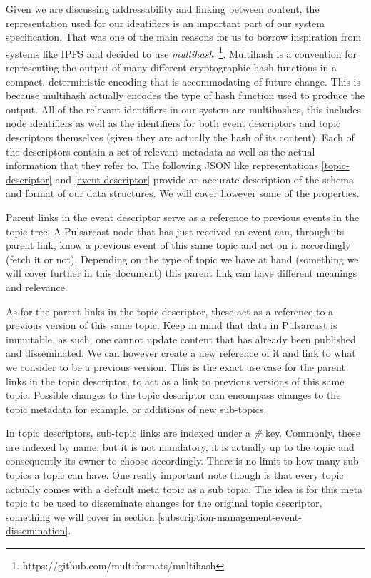 Given we are discussing addressability and linking between content, the
representation used for our identifiers is an important part of our system
specification. That was one of the main reasons for us to borrow inspiration
from systems like IPFS and decided to use
\emph{multihash}~\footnote{https://github.com/multiformats/multihash}.
Multihash is a convention for representing the output of many different
cryptographic hash functions in a compact, deterministic encoding that is
accommodating of future change. This is because multihash actually encodes the
type of hash function used to produce the output. All of the relevant
identifiers in our system are multihashes, this includes node identifiers as
well as the identifiers for both event descriptors and topic descriptors
themselves (given they are actually the hash of its content). Each of the
descriptors contain a set of relevant metadata as well as the actual
information that they refer to. The following JSON like representations
\ref{topic-descriptor} and \ref{event-descriptor} provide an accurate
description of the schema and format of our data structures. We will cover
however some of the properties.

Parent links in the event descriptor serve as a reference to previous events in
the topic tree. A Pulsarcast node that has just received an event can, through
its parent link, know a previous event of this same topic and act on it
accordingly (fetch it or not). Depending on the type of topic we have at hand
(something we will cover further in this document) this parent link can have
different meanings and relevance.

As for the parent links in the topic descriptor, these act as a reference to a
previous version of this same topic. Keep in mind that data in Pulsarcast is
immutable, as such, one cannot update content that has already been published
and disseminated. We can however create a new reference of it and link to what
we consider to be a previous version. This is the exact use case for the parent
links in the topic descriptor, to act as a link to previous versions of this
same topic. Possible changes to the topic descriptor can encompass changes to
the topic metadata for example, or additions of new sub-topics.

In topic descriptors, sub-topic links are indexed under a \emph{\#} key.
Commonly, these are indexed by name, but it is not mandatory, it is actually up
to the topic and consequently its owner to choose accordingly.  There is no
limit to how many sub-topics a topic can have. One really important note though is that every topic actually comes with a default meta topic as a sub topic. The idea is for this meta topic to be used to disseminate changes for the original topic descriptor, something we will cover in section \ref{subscription-management-event-dissemination}.

